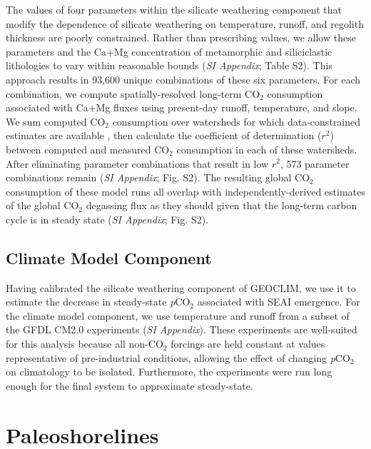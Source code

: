 \documentclass[9pt,twocolumn,twoside,lineno]{pnas-new}
\newcommand{\pCOtwo}{\textit{p}CO$_{2}$\xspace}
\newcommand{\COtwo}{CO$_{2}$\xspace}
\newcommand{\SI}{\textit{SI Appendix}\xspace}
\begin{document}
The values of four parameters within the silicate weathering component that modify the dependence of silicate weathering on temperature, runoff, and regolith thickness are poorly constrained. Rather than prescribing values, we allow these parameters and the Ca+Mg concentration of metamorphic and siliciclastic lithologies to vary within reasonable bounds (\SI; Table S2). This approach results in 93,600 unique combinations of these six parameters. For each combination, we compute spatially-resolved long-term \COtwo consumption associated with Ca+Mg fluxes using present-day runoff, temperature, and slope. We sum computed \COtwo consumption over watersheds for which data-constrained estimates are available \cite{Gaillardet1999a, Moquet2018a}, then calculate the coefficient of determination ($r^{2}$) between computed and measured \COtwo consumption in each of these watersheds. After eliminating parameter combinations that result in low $r^{2}$, 573 parameter combinations remain (\SI; Fig. S2). The resulting global \COtwo consumption of these model runs all overlap with independently-derived estimates of the global \COtwo degassing flux \cite{Gerlach2011a} as they should given that the long-term carbon cycle is in steady state (\SI; Fig. S2).

\subsection*{Climate Model Component}

Having calibrated the silicate weathering component of GEOCLIM, we use it to estimate the decrease in steady-state \pCOtwo associated with SEAI emergence. For the climate model component, we use temperature and runoff from a subset of the GFDL CM2.0 experiments \cite{Delworth2006b} (\SI). These experiments are well-suited for this analysis because all non-\COtwo forcings are held constant at values representative of pre-industrial conditions, allowing the effect of changing \pCOtwo on climatology to be isolated. Furthermore, the experiments were run long enough for the final system to approximate steady-state.

\section*{Paleoshorelines}
\end{document}
